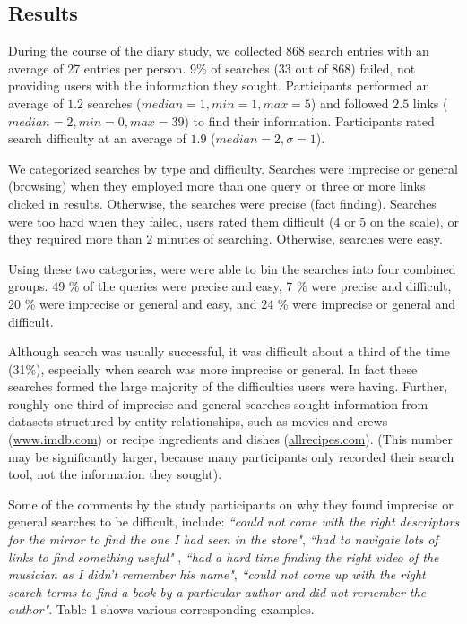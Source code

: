 \subsection{Results}

During the course of the diary study, we collected $868$ search entries with an average of 27 entries per person. 9\% of searches (33 out of 868) failed, not providing users with the information they sought. Participants performed an average of $1.2$ searches ($median=1, min =1, max=5$) and followed $2.5$ links ($median=2, min=0, max=39$) to find their information. Participants rated search difficulty at an average of $1.9$ ($median=2,  \sigma=1$). 

We categorized searches by type and difficulty. Searches were imprecise or general (browsing) when they employed more than one query or three or more links clicked in results. Otherwise, the searches were precise (fact finding). Searches were too hard when they failed, users rated them difficult ($4$ or $5$ on the scale), or they required more than $2$ minutes of searching. Otherwise, searches were easy. 

Using these two categories, were were able to bin the searches into four combined groups. 49 \% of the queries were precise and easy, 7 \% were precise and difficult, 20 \% were imprecise or general and easy, and 24 \% were imprecise or general and difficult. 

Although search was usually successful, it was difficult about a third of the time (31\%), especially when search was more imprecise or general. In fact these searches formed the large majority of the difficulties users were having. Further, roughly one third of imprecise and general searches sought information from datasets structured by entity relationships, such as movies and crews (\url{www.imdb.com}) or recipe ingredients and dishes (\url{allrecipes.com}). (This number may be significantly larger, because many participants only recorded their search tool, not the information they sought).

Some of the comments by the study participants on why they found imprecise or general searches to be difficult, include: \textit{``could not come with the right descriptors for the mirror to find the one I had seen in the store"}, \textit{``had to navigate lots of links to find something useful"} , \textit{``had a hard time finding the right video of the musician as I didn't remember his name"}, \textit{``could not come up with the right search terms to find a book by a particular author and did not remember the author"}. Table 1 shows various corresponding examples.

